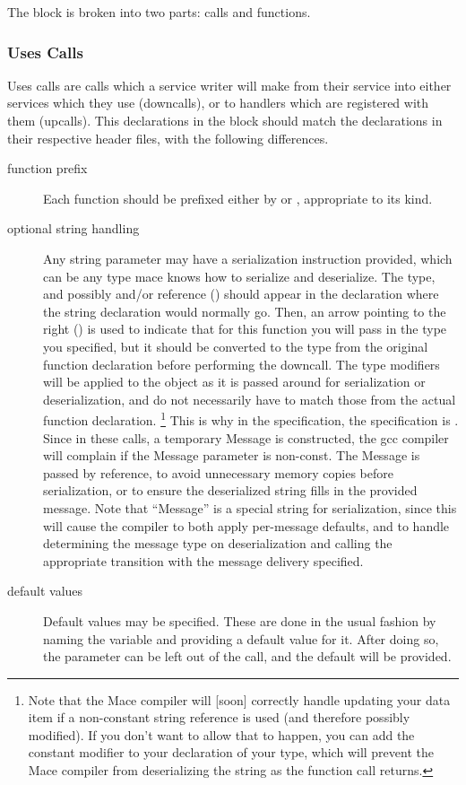 The  block is broken into two parts:
 calls and  functions.

\subsubsection*{Uses Calls}

Uses calls are calls which a service writer will make from their service into
either services which they use (downcalls), or to handlers which are registered
with them (upcalls).  This declarations in the block should match the declarations
in their respective header files, with the following differences.

\begin{description}

\item[function prefix] Each function should be prefixed either by
 or , appropriate to its kind.

\item[optional string handling] Any string parameter may have a
serialization instruction provided, which can be any type mace knows
how to serialize and deserialize.  The type, and possibly
 and/or reference (\symbolkw{\&}) should appear in the
declaration where the string declaration would normally go.  Then, an
arrow pointing to the right (\symbolkw{->}) is used to indicate that
for this function you will pass in the type you specified, but it
should be converted to the type from the original function declaration
before performing the downcall.  The type modifiers will be applied to
the object as it is passed around for serialization or
deserialization, and do not necessarily have to match those from the
actual function declaration.  \footnote{Note that the Mace compiler
will [soon] correctly handle updating your data item if a non-constant
string reference is used (and therefore possibly modified).  If you
don't want to allow that to happen, you can add the constant modifier
to your declaration of your type, which will prevent the Mace compiler
from deserializing the string as the function call returns.}  This is
why in the  specification, the specification
is .  Since in these calls, a temporary
Message is constructed, the gcc compiler will complain if the Message
parameter is non-const.  The Message is passed by reference, to avoid
unnecessary memory copies before serialization, or to ensure the
deserialized string fills in the provided message.  Note that
``Message'' is a special string for serialization, since this will
cause the compiler to both apply per-message defaults, and to handle
determining the message type on deserialization and calling the
appropriate transition with the message delivery specified.

\item[default values] Default values may be specified.  These are done in the
usual fashion by naming the variable and providing a default value for it.
After doing so, the parameter can be left out of the call, and the default will
be provided. 
\end{description}

